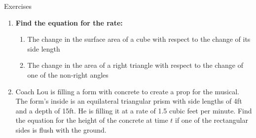 \documentclass[../revisedmain.tex]{subfiles}
\begin{document}
	\newpage
\begin{center}
	\LARGE Exercises
\end{center}
\begin{enumerate}
	\item \textbf{Find the equation for the rate:}
	\begin{enumerate}
		\item The change in the surface area of a cube with respect to the change of its side length
		\item The change in the area of a right triangle with respect to the change of one of the non-right angles
	\end{enumerate}
	\item Coach Lou is filling a form with concrete to create a prop for the musical. The form's inside is an equilateral triangular prism with side lengths of 4ft and a depth of 15ft. He is filling it at a rate of 1.5 cubic feet per minute. Find the equation for the height of the concrete at time $t$ if one of the rectangular sides is flush with the ground.
\end{enumerate}
\end{document}

